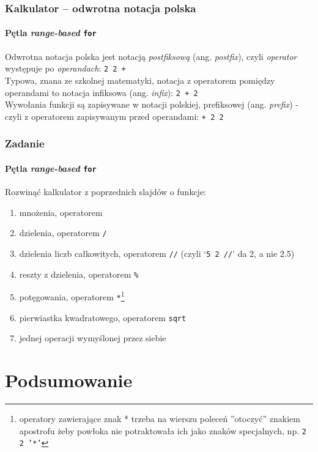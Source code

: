 \documentclass[aspectratio=169]{beamer}
\begin{document}
\begin{frame}
    \frametitle{Kalkulator -- odwrotna notacja polska}
    \framesubtitle{Pętla \emph{range-based} {\tt for}}

    Odwrotna notacja polska jest notacją \emph{postfiksową} (ang.
    \emph{postfix}), czyli \emph{operator} występuje po \emph{operandach}:
    {\tt 2 2 +}\\
    Typowa, znana ze szkolnej matematyki, notacja z operatorem pomiędzy
    operandami to notacja infiksowa (ang. \emph{infix}): {\tt 2 + 2}\\
    Wywołania funkcji są zapisywane w notacji polskiej, prefiksowej (ang.
    \emph{prefix}) - czyli z operatorem zapisywanym przed operandami: {\tt + 2
    2}
\end{frame}

\begin{frame}
    \frametitle{Zadanie}
    \framesubtitle{Pętla \emph{range-based} {\tt for}}
    \label{lecture_exercise_5}

    Rozwinąć kalkulator z poprzednich slajdów o funkcje:

    {\footnotesize
    \begin{enumerate}
        \item mnożenia, operatorem {\tt *}
        \item dzielenia, operatorem {\tt /}
        \item dzielenia liczb całkowitych, operatorem {\tt //} (czyli `{\tt 5 2
            //}' da 2, a nie 2.5)
        \item reszty z dzielenia, operatorem {\tt \%}
        \item potęgowania, operatorem {\tt **}\footnote{operatory zawierające
            znak * trzeba na wierszu poleceń ''otoczyć'' znakiem apostrofu żeby
            powłoka nie potraktowała ich jako znaków specjalnych, np. {\tt 2 2
            '*'}}
        \item pierwiastka kwadratowego, operatorem {\tt sqrt}
        \item jednej operacji wymyślonej przez siebie
    \end{enumerate}}
\end{frame}

\section{Podsumowanie}
\end{document}
